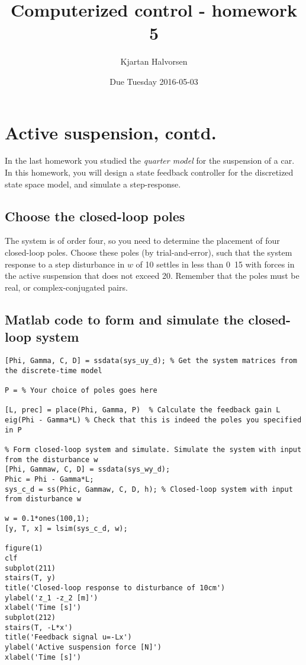 \documentclass{scrartcl}
\author{Kjartan Halvorsen}
\date{Due Tuesday 2016-05-03}
\title{Computerized control - homework 5}
\begin{document}
\maketitle

\section*{Active suspension, contd.}
\label{sec:orgheadline3}
In the last homework you studied the \emph{quarter model} for the suspension of a car. In this homework, you will design a state feedback controller for the discretized state space model, and simulate a step-response.

\subsection*{Choose the closed-loop poles}
\label{sec:orgheadline1}
The system is of order four, so you need to determine the placement of four closed-loop poles. Choose these poles (by trial-and-error), such that the system response to a step disturbance in \(w\) of \unit{10}{\centi\meter} settles in less than \unit{0.15}{\second} with forces in the active suspension that does not exceed \unit{20}{\kilo\newton}. Remember that the poles must be real, or complex-conjugated pairs. 

\subsection*{Matlab code to form and simulate the closed-loop system}
\label{sec:orgheadline2}

\begin{verbatim}
[Phi, Gamma, C, D] = ssdata(sys_uy_d); % Get the system matrices from the discrete-time model

P = % Your choice of poles goes here

[L, prec] = place(Phi, Gamma, P)  % Calculate the feedback gain L
eig(Phi - Gamma*L) % Check that this is indeed the poles you specified in P

% Form closed-loop system and simulate. Simulate the system with input from the disturbance w
[Phi, Gammaw, C, D] = ssdata(sys_wy_d);
Phic = Phi - Gamma*L;
sys_c_d = ss(Phic, Gammaw, C, D, h); % Closed-loop system with input from disturbance w

w = 0.1*ones(100,1);
[y, T, x] = lsim(sys_c_d, w);

figure(1)
clf
subplot(211)
stairs(T, y)
title('Closed-loop response to disturbance of 10cm')
ylabel('z_1 -z_2 [m]')
xlabel('Time [s]')
subplot(212)
stairs(T, -L*x')
title('Feedback signal u=-Lx')
ylabel('Active suspension force [N]')
xlabel('Time [s]')
\end{verbatim}
\end{document}
